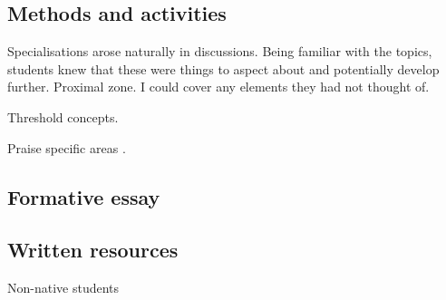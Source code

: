 \subsection{Methods and activities}\label{sec:essay-methods}

Specialisations arose naturally in discussions. Being familiar with the topics, students knew that these were things to aspect about and potentially develop further. Proximal zone. I could cover any elements they had not thought of.

Threshold concepts.

Praise specific areas \citep{Henderlong2002}.

\subsection{Formative essay}\label{sec:formative}

\subsection{Written resources}\label{sec:blog}

Non-native students
